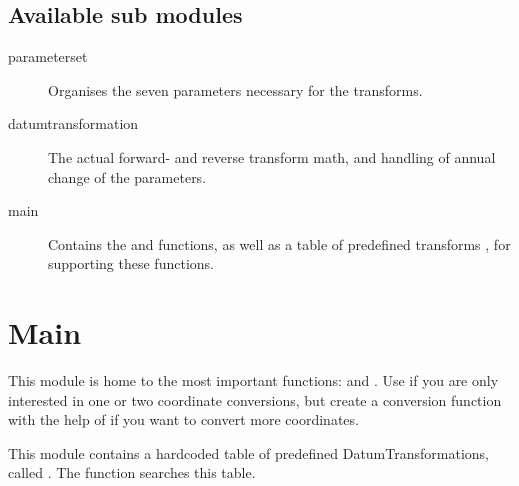 \documentclass[a4paper,10pt,english]{sphinxmanual}
\begin{document}
\subsection{Available sub modules}
\label{\detokenize{api-docs:available-sub-modules}}\begin{description}
\item[{parameterset}] \leavevmode
Organises the seven parameters necessary for the transforms.

\item[{datumtransformation}] \leavevmode
The actual forward- and reverse transform math, and handling of
annual change of the parameters.

\item[{main}] \leavevmode
Contains the  and  functions, as well as
a table of predefined transforms , for supporting
these functions.

\end{description}


\section{Main}
\label{\detokenize{api-docs:module-etrsitrs.main}}\label{\detokenize{api-docs:main}}
This module is home to the most important functions:  and
. Use  if you are only interested in one or
two coordinate conversions, but create a conversion function with the
help of  if you want to convert more coordinates.

This module contains a hardcoded table of predefined
DatumTransformations, called . The function
 searches this table.
\end{document}

